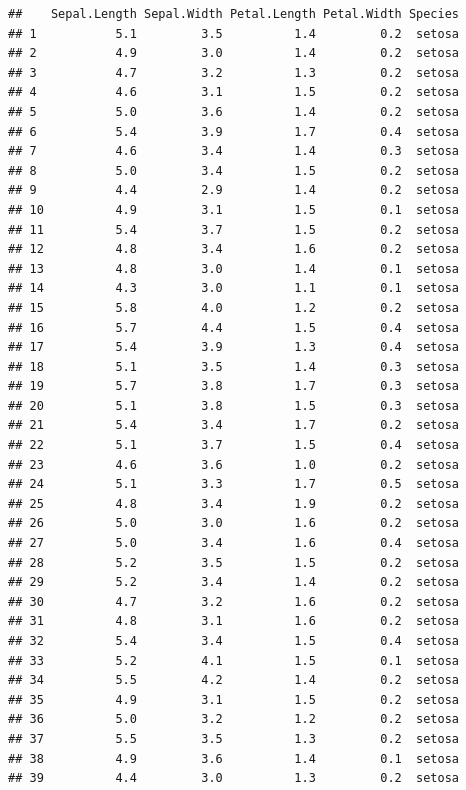 \documentclass[
]{book}
\begin{document}
\begin{verbatim}
##    Sepal.Length Sepal.Width Petal.Length Petal.Width Species
## 1           5.1         3.5          1.4         0.2  setosa
## 2           4.9         3.0          1.4         0.2  setosa
## 3           4.7         3.2          1.3         0.2  setosa
## 4           4.6         3.1          1.5         0.2  setosa
## 5           5.0         3.6          1.4         0.2  setosa
## 6           5.4         3.9          1.7         0.4  setosa
## 7           4.6         3.4          1.4         0.3  setosa
## 8           5.0         3.4          1.5         0.2  setosa
## 9           4.4         2.9          1.4         0.2  setosa
## 10          4.9         3.1          1.5         0.1  setosa
## 11          5.4         3.7          1.5         0.2  setosa
## 12          4.8         3.4          1.6         0.2  setosa
## 13          4.8         3.0          1.4         0.1  setosa
## 14          4.3         3.0          1.1         0.1  setosa
## 15          5.8         4.0          1.2         0.2  setosa
## 16          5.7         4.4          1.5         0.4  setosa
## 17          5.4         3.9          1.3         0.4  setosa
## 18          5.1         3.5          1.4         0.3  setosa
## 19          5.7         3.8          1.7         0.3  setosa
## 20          5.1         3.8          1.5         0.3  setosa
## 21          5.4         3.4          1.7         0.2  setosa
## 22          5.1         3.7          1.5         0.4  setosa
## 23          4.6         3.6          1.0         0.2  setosa
## 24          5.1         3.3          1.7         0.5  setosa
## 25          4.8         3.4          1.9         0.2  setosa
## 26          5.0         3.0          1.6         0.2  setosa
## 27          5.0         3.4          1.6         0.4  setosa
## 28          5.2         3.5          1.5         0.2  setosa
## 29          5.2         3.4          1.4         0.2  setosa
## 30          4.7         3.2          1.6         0.2  setosa
## 31          4.8         3.1          1.6         0.2  setosa
## 32          5.4         3.4          1.5         0.4  setosa
## 33          5.2         4.1          1.5         0.1  setosa
## 34          5.5         4.2          1.4         0.2  setosa
## 35          4.9         3.1          1.5         0.2  setosa
## 36          5.0         3.2          1.2         0.2  setosa
## 37          5.5         3.5          1.3         0.2  setosa
## 38          4.9         3.6          1.4         0.1  setosa
## 39          4.4         3.0          1.3         0.2  setosa

\end{verbatim}
\end{document}
